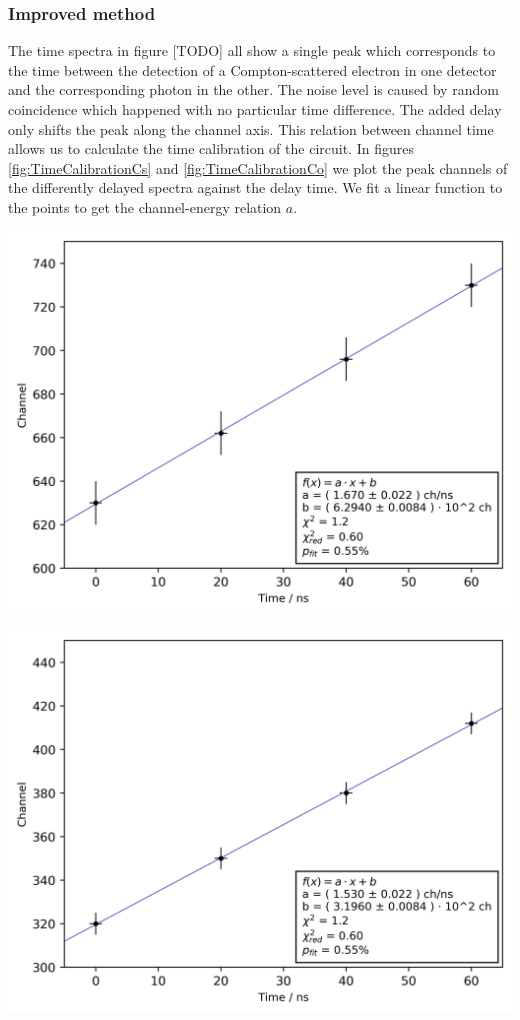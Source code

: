 \subsubsection{Improved method}
%
The time spectra in figure [TODO] all show a single peak which corresponds to the time between the detection of a Compton-scattered electron in one detector and the corresponding photon in the other.
The noise level is caused by random coincidence which happened with no particular time difference.
The added delay only shifts the peak along the channel axis.
This relation between channel time allows us to calculate the time calibration of the circuit.
In figures \ref{fig:TimeCalibrationCs} and \ref{fig:TimeCalibrationCo} we plot the peak channels of the differently delayed spectra against the delay time.
We fit a linear function to the points to get the channel-energy relation $a$.
%
\begin{multicolfloat}
    \includegraphics[width=\linewidth]{png/time_calibration-cs}
    \label{fig:TimeCalibrationCs}
\end{multicolfloat}
%
\begin{multicolfloat}
    \includegraphics[width=\linewidth]{png/time_calibration-co}
    \label{fig:TimeCalibrationCo}
\end{multicolfloat}
